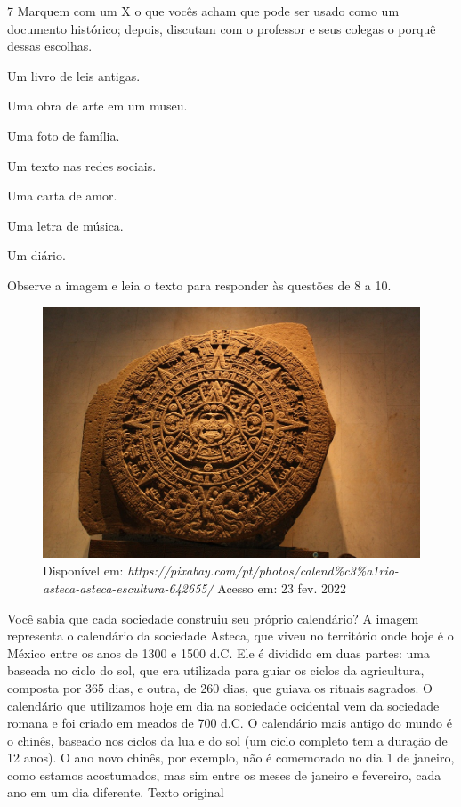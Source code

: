 \begin{itemize}
\num{7} Marquem com um X o que vocês acham que pode ser usado como um documento
histórico; depois, discutam com o professor e seus colegas o porquê
dessas escolhas.

\begin{boxlist}
\item
  Um livro de leis antigas.
\item
  Uma obra de arte em um museu.
\item
  Uma foto de família.
\item
  Um texto nas redes sociais.
\item
  Uma carta de amor.
\item
  Uma letra de música.
\item
  Um diário.
\end{boxlist}


Observe a imagem e leia o texto para responder às questões de 8 a 10.

\begin{figure}[htpb!]
\includegraphics[width=.5\textwidth]{./imgs/img32.png}
\caption{Disponível em: {\emph{https://pixabay.com/pt/photos/calend\%c3\%a1rio-asteca-asteca-escultura-642655/}} Acesso em: 23 fev. 2022}
\end{figure}

Você sabia que cada sociedade construiu seu próprio calendário? A imagem representa o calendário da sociedade Asteca, que viveu no território onde hoje é o México entre os anos de 1300 e 1500 d.C. Ele
é dividido em duas partes: uma baseada no ciclo do sol, que era utilizada para guiar os ciclos da agricultura, composta por 365 dias, e outra, de 260 dias, que guiava os rituais sagrados. O calendário que
utilizamos hoje em dia na sociedade ocidental vem da sociedade romana e foi criado em meados de 700 d.C. O calendário mais antigo do mundo é o chinês, baseado nos ciclos da lua e do sol (um ciclo completo tem a duração de 12 anos). O ano novo chinês, por exemplo, não é comemorado no dia 1 de janeiro, como estamos acostumados, mas sim entre os meses de janeiro e fevereiro, cada ano em um dia diferente. Texto original


\end{itemize}
